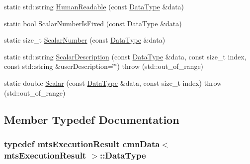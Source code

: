 \begin{DoxyCompactItemize}
\item 
static std\+::string \hyperlink{classcmn_data_3_01mts_execution_result_01_4_a18792f83a83729ebe0ee369e42c179dc}{Human\+Readable} (const \hyperlink{classcmn_data_3_01mts_execution_result_01_4_ac2ad50be3b07e7b046435ae0ed516b18}{Data\+Type} \&data)
\item 
static bool \hyperlink{classcmn_data_3_01mts_execution_result_01_4_a0f0946923fe1c3f668d9a48316c038b7}{Scalar\+Number\+Is\+Fixed} (const \hyperlink{classcmn_data_3_01mts_execution_result_01_4_ac2ad50be3b07e7b046435ae0ed516b18}{Data\+Type} \&data)
\item 
static size\+\_\+t \hyperlink{classcmn_data_3_01mts_execution_result_01_4_af7b1e7ea8aa59ebecd4e29d357a757ab}{Scalar\+Number} (const \hyperlink{classcmn_data_3_01mts_execution_result_01_4_ac2ad50be3b07e7b046435ae0ed516b18}{Data\+Type} \&data)
\item 
static std\+::string \hyperlink{classcmn_data_3_01mts_execution_result_01_4_a0f4e88c5b061067bdea342ede82669a1}{Scalar\+Description} (const \hyperlink{classcmn_data_3_01mts_execution_result_01_4_ac2ad50be3b07e7b046435ae0ed516b18}{Data\+Type} \&data, const size\+\_\+t index, const std\+::string \&user\+Description=\char`\"{}\char`\"{})  throw (std\+::out\+\_\+of\+\_\+range)
\item 
static double \hyperlink{classcmn_data_3_01mts_execution_result_01_4_a956663b56c396d27059bfa6cc8f70c21}{Scalar} (const \hyperlink{classcmn_data_3_01mts_execution_result_01_4_ac2ad50be3b07e7b046435ae0ed516b18}{Data\+Type} \&data, const size\+\_\+t index)  throw (std\+::out\+\_\+of\+\_\+range)
\end{DoxyCompactItemize}


\subsection{Member Typedef Documentation}
\hypertarget{classcmn_data_3_01mts_execution_result_01_4_ac2ad50be3b07e7b046435ae0ed516b18}{}
\subsubsection[{Data\+Type}]{\setlength{\rightskip}{0pt plus 5cm}typedef {\bf mts\+Execution\+Result} {\bf cmn\+Data}$<$ {\bf mts\+Execution\+Result} $>$\+::{\bf Data\+Type}}\label{classcmn_data_3_01mts_execution_result_01_4_ac2ad50be3b07e7b046435ae0ed516b18}


